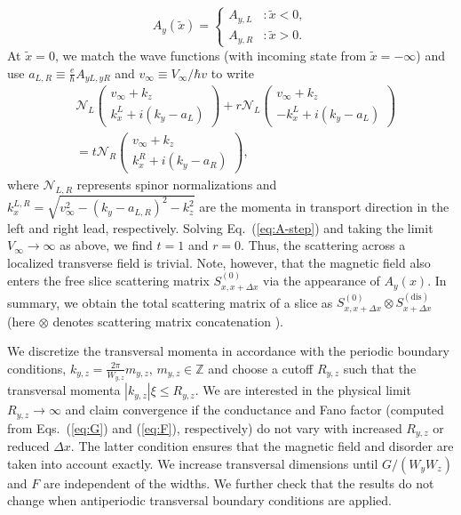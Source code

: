 \documentclass[aps,prb,10pt,amsmath,amssymb,twocolumn,floatfix,superscriptaddress,showpacs,numerical,footinbib]{revtex4-1}
\begin{document}
\begin{equation}
A_{y}(\tilde{x})=\begin{cases}
A_{y,L} & :\tilde{x}<0,\\
A_{y,R} & :\tilde{x}>0.
\end{cases}
\end{equation}
At $\tilde{x}=0$, we match the wave functions (with incoming state
from $\tilde{x}=-\infty$) and use $a_{L,R}\equiv\frac{e}{\hbar}A_{yL,yR}$
and $v_{\infty}\equiv V_{\infty}/\hbar v$ to write
\begin{align}
&\mathcal{N}_{L}\begin{pmatrix}v_{\infty}+k_{z}\\
k_{x}^{L}+i(k_{y}-a_{L})
\end{pmatrix}+r\mathcal{N}_{L}\begin{pmatrix}v_{\infty}+k_{z}\\
-k_{x}^{L}+i(k_{y}-a_{L})
\end{pmatrix} \nonumber \\
& =t\mathcal{N}_{R}\begin{pmatrix}v_{\infty}+k_{z}\\
k_{x}^{R}+i(k_{y}-a_{R})
\end{pmatrix},\label{eq:A-step}
\end{align}
where $\mathcal{N}_{L,R}$ represents spinor normalizations and $k_{x}^{L,R}=\sqrt{v_{\infty}^{2}-\left(k_{y}-a_{L,R}\right)^{2}-k_{z}^{2}}$
are the momenta in transport direction in the left and right lead,
respectively. Solving Eq.~(\ref{eq:A-step}) and taking the limit
$V_{\infty}\rightarrow\infty$ as above, we find $t=1$ and $r=0$.
Thus, the scattering across a localized transverse field is trivial.
Note, however, that the magnetic field also enters the free slice scattering
matrix $S_{x,x+\Delta x}^{(0)}$ via the appearance of $A_y(x)$.
%
In summary, we obtain the total scattering matrix of a slice as $S_{x,x+\Delta x}^{(0)}\otimes S_{x+\Delta x}^{(\mathrm{dis})}$
(here $\otimes$ denotes scattering matrix concatenation \cite{Datta1997}).

We discretize the transversal momenta in accordance with the periodic boundary conditions, $k_{y,z}=\frac{2\pi}{W_{y,z}}m_{y,z}$, $m_{y,z}\in \mathbb{Z}$ and choose a cutoff $R_{y,z}$ such that the transversal momenta $|k_{y,z}|\xi\leq R_{y,z}$.
%
We are interested in the physical limit $R_{y,z}\rightarrow \infty$ and claim convergence if the conductance and Fano factor (computed from Eqs.~(\ref{eq:G}) and (\ref{eq:F}), respectively) do not vary with increased $R_{y,z}$
or reduced $\Delta x$.
%
The latter condition ensures that the magnetic field and disorder are taken into account exactly.
%
We increase transversal dimensions until $G/(W_y W_z)$ and $F$ are independent of the widths. We further check that the results do not change when antiperiodic transversal boundary conditions are applied.
\end{document}
